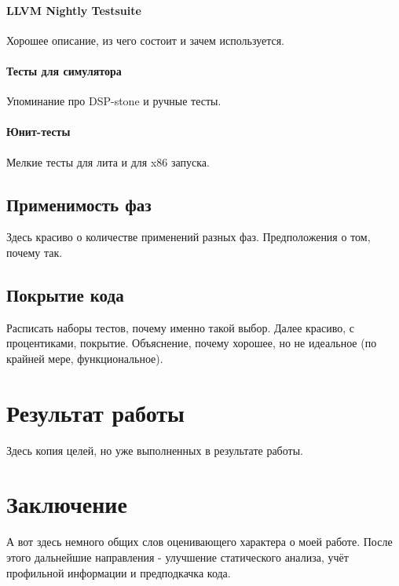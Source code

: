 \documentclass[12pt,a4paper]{article}
\begin{document}
\paragraph{LLVM Nightly Testsuite}

Хорошее описание, из чего состоит и зачем используется.

\paragraph{Тесты для симулятора}

Упоминание про DSP-stone и ручные тесты.

\paragraph{Юнит-тесты}

Мелкие тесты для лита и для x86 запуска.

\subsection{Применимость фаз}

Здесь красиво о количестве применений разных фаз. Предположения о том, почему так.

\subsection{Покрытие кода}

Расписать наборы тестов, почему именно такой выбор. Далее красиво, с процентиками, покрытие. Объяснение, почему хорошее, но не идеальное (по крайней мере, функциональное).

\section{Результат работы}

Здесь копия целей, но уже выполненных в результате работы.

\section{Заключение}

А вот здесь немного общих слов оценивающего характера о моей работе. После этого дальнейшие направления - улучшение статического анализа, учёт профильной информации и предподкачка кода.
\end{document}
